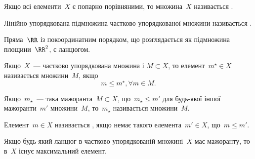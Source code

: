 \begin{definition}
Якщо всі елементи~$X$ є попарно порівняними, то
множина~$X$ називається .
\end{definition}

\begin{definition}
Лінійно упорядкована підмножина частково
упорядкованої множини називається .
\end{definition}

\begin{example}
Пряма~$\RR$ із покоординатним порядком, що
розглядається як підмножина площини~$\RR^2$, є ланцюгом.
\end{example}

\begin{definition}
Якщо~$X$~--- частково упорядкована множина і
$M \subset X$, то елемент~$m^\star \in X$ називається 
множини~$M$, якщо
\begin{equation*}
    m \le m^\star, \forall m \in M.
\end{equation*}
\end{definition}

\begin{definition}
Якщо~$m_\star$~--- така мажоранта~$M \subset X$, що~$m_\star \le m'$
для будь-якої іншої мажоранти~$m'$ множини~$M$, то~$m_\star$
називається  множини~$M$.
\end{definition}

\begin{definition}
Елемент~$m \in X$ називається ,
якщо немає такого елемента~$m' \in X$, що~$m \le m'$.
\end{definition}

\begin{lemma}[Цорна] Якщо будь-який ланцюг в частково
упорядкованій множині~$X$ має мажоранту, то в~$X$ існує
максимальний елемент.
\end{lemma}

